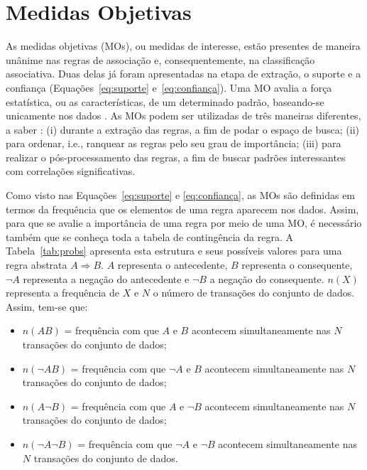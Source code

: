 \section{Medidas Objetivas}\label{sec:mo}

As medidas objetivas (MOs), ou medidas de interesse, estão presentes de maneira unânime nas regras de associação e, consequentemente, na classificação associativa. Duas delas já foram apresentadas na etapa de extração, o suporte e a confiança (Equações~\ref{eq:suporte} e~\ref{eq:confiança}). Uma MO avalia a força estatística, ou as características, de um determinado padrão, baseando-se unicamente nos dados \cite{Bong2014}. As MOs podem ser utilizadas de três maneiras diferentes, a saber \cite{Geng2006}: (i) durante a extração das regras, a fim de podar o espaço de busca; (ii) para ordenar, i.e., ranquear as regras pelo seu grau de importância; (iii) para realizar o pós-processamento das regras, a fim de buscar padrões interessantes com correlações significativas.

Como visto nas Equações~\ref{eq:suporte} e \ref{eq:confiança}, as MOs são definidas em termos da frequência que os elementos de uma regra aparecem nos dados. Assim, para que se avalie a importância de uma regra por meio de uma MO, é necessário também que se conheça toda a tabela de contingência da regra. A Tabela~\ref{tab:probs} apresenta esta estrutura e seus possíveis valores para uma regra abstrata $A \Rightarrow B$. $A$ representa o antecedente, $B$ representa o consequente, $\neg A$ representa a negação do antecedente e $\neg B$ a negação do consequente. $n(X)$ representa a frequência de $X$ e $N$ o número de transações do conjunto de dados. Assim, tem-se que:
\begin{itemize}
    \item $n(AB)$ = frequência com que $A$ e $B$ acontecem simultaneamente nas $N$ transações do conjunto de dados;
    \item $n(\neg AB)$ = frequência com que $\neg A$ e $B$ acontecem simultaneamente nas $N$ transações do conjunto de dados;
    \item $n(A \neg B)$ = frequência com que $A$ e $\neg B$ acontecem simultaneamente nas $N$ transações do conjunto de dados;
    \item $n(\neg A \neg B)$ = frequência com que $\neg A$ e $\neg B$ acontecem simultaneamente nas $N$ transações do conjunto de dados.
\end{itemize}

